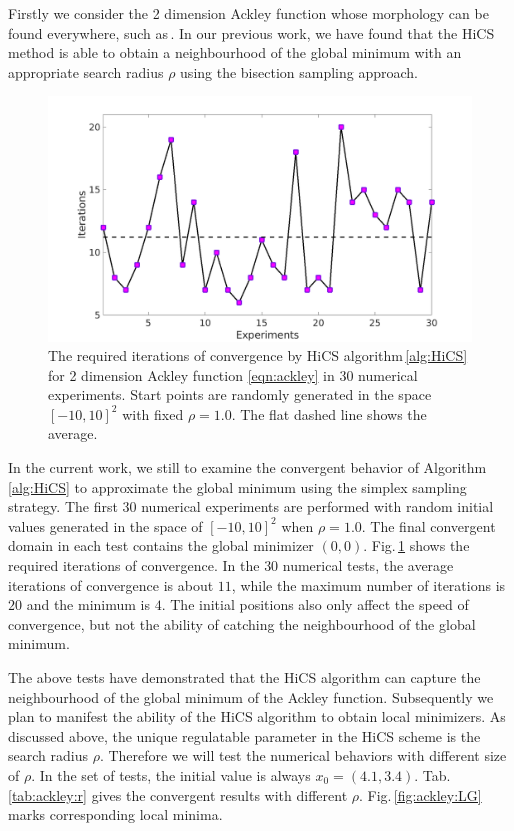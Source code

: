 \documentclass[final,1p,times]{elsarticle}
\begin{document}
Firstly we consider the 2 dimension Ackley function whose   
morphology can be found everywhere, such
as\,\cite{huang2017hill}.
In our previous work, we have found that the 
HiCS method is able to obtain a neighbourhood of the
global minimum with an appropriate search radius $\rho$ using the
bisection sampling approach. 
\begin{figure}[!htbp]
	\centering
	  \includegraphics[scale=0.3]{../figures/ackley2Drand.png}
	  \caption{The required iterations of convergence by HiCS
	  algorithm\,\ref{alg:HiCS} for 2 dimension Ackley function
	  \eqref{eqn:ackley} in $30$ numerical experiments. 
	  Start points are randomly generated in the space
	  $[-10, 10]^2$ with fixed $\rho=1.0$.
	  The flat dashed line shows the average.} 
	  \label{fig:ackley:randInit}
\end{figure}
In the current work, we still to examine the convergent behavior of
Algorithm\,\ref{alg:HiCS} to approximate the global minimum using
the simplex sampling strategy. The first $30$ numerical
experiments are performed with random initial values generated in
the space of $[-10, 10]^2$ when $\rho=1.0$.
The final convergent domain in each test contains the global minimizer $(0,0)$.
Fig.\,\ref{fig:ackley:randInit} shows the required iterations
of convergence. In the $30$ numerical tests, the average iterations of
convergence is about $11$, while the maximum number of
iterations is $20$ and the minimum is $4$. 
The initial positions also only affect the
speed of convergence, but not the ability of catching the
neighbourhood of the global minimum. 

The above tests have demonstrated that the HiCS
algorithm can capture the neighbourhood of the global minimum of
the Ackley function. 
Subsequently we plan to manifest the ability of the 
HiCS algorithm to obtain local minimizers.
As discussed above, the unique regulatable parameter in the 
HiCS scheme is the search radius $\rho$. Therefore we
will test the numerical behaviors with different size of $\rho$.
In the set of tests, the initial value is always $x_0=(4.1,3.4)$.
Tab.\,\ref{tab:ackley:r} gives the convergent results with
different $\rho$. Fig.\,\ref{fig:ackley:LG} marks
corresponding local minima.
\end{document}
